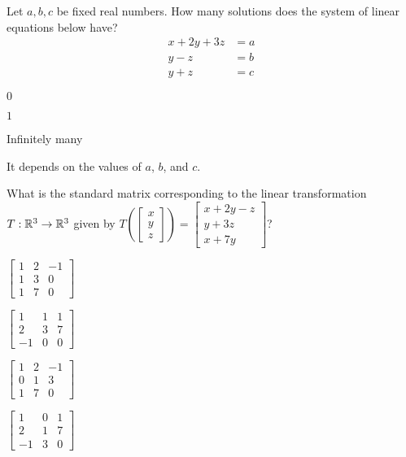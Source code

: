 \documentclass{article}
\begin{document}
\begin{readinessAssuranceTest}
\item Let $a, b, c$ be fixed real numbers.  How many solutions does the system of linear equations below have?
\begin{align*}
x+2y+3z &= a \\
y-z &= b \\
y+z &= c
\end{align*}

\begin{multicols}{4}
\begin{readinessAssuranceTestChoices}
\item $0$
\item $1$ %
\item Infinitely many
\item It depends on the values of $a$, $b$, and $c$.
\end{readinessAssuranceTestChoices}
\end{multicols}


\item What is the standard matrix corresponding to the linear transformation $T: \mathbb{R}^3 \rightarrow \mathbb{R}^3$ given by $T\left( \begin{bmatrix} x \\ y \\ z \end{bmatrix}\right) = \begin{bmatrix} x+2y-z \\ y+3z \\x+7y \end{bmatrix}$?
\begin{multicols}{4}
\begin{readinessAssuranceTestChoices}
\item $\begin{bmatrix} 1 & 2 & -1 \\ 1 & 3 & 0 \\ 1 & 7 & 0 \end{bmatrix}$
\item $\begin{bmatrix} 1 & 1 & 1 \\ 2 & 3 & 7 \\ -1 & 0 & 0 \end{bmatrix}$
\item $\begin{bmatrix} 1 & 2 & -1 \\ 0 & 1 & 3 \\ 1 & 7 & 0 \end{bmatrix}$ %
\item $\begin{bmatrix}  1 & 0 & 1 \\ 2 & 1 & 7 \\ -1 & 3 & 0 \end{bmatrix}$
\end{readinessAssuranceTestChoices}
\end{multicols}


\end{readinessAssuranceTest}
\end{document}
